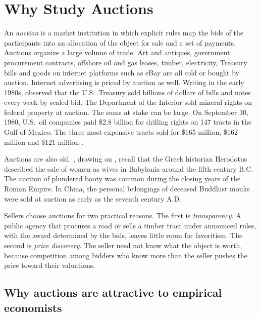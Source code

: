 
\section{Why Study Auctions}\label{sec:14-why}

An \emph{auction} is a market institution in which explicit rules map the bids of the participants into an
allocation of the object for sale and a set of payments. Auctions organize a large volume of trade. Art and
antiques, government procurement contracts, offshore oil and gas leases, timber, electricity, Treasury bills
and goods on internet platforms such as eBay are all sold or bought by auction. Internet advertising is
priced by auction as well. Writing in the early 1980s, \citet[p.~1089]{MilgromWeber1982} observed that the
U.S.\ Treasury sold billions of dollars of bills and notes every week by sealed bid. The Department of the
Interior sold mineral rights on federal property at auction. The sums at stake can be large. On September
30, 1980, U.S.\ oil companies paid \$2.8 billion for drilling rights on 147 tracts in the Gulf of Mexico.
The three most expensive tracts sold for \$165 million, \$162 million and \$121 million
\citep[p.~1089, footnote~3]{MilgromWeber1982}.

Auctions are also old. \citet[p.~1089]{MilgromWeber1982}, drawing on \citet{Cassady1967}, recall that the
Greek historian Herodotus described the sale of women as wives in Babylonia around the fifth century B.C.
The auction of plundered booty was common during the closing years of the Roman Empire. In China, the
personal belongings of deceased Buddhist monks were sold at auction as early as the seventh century A.D.

Sellers choose auctions for two practical reasons. The first is \emph{transparency}. A public agency that
procures a road or sells a timber tract under announced rules, with the award determined by the bids,
leaves little room for favoritism. The second is \emph{price discovery}. The seller need not know what the
object is worth, because competition among bidders who know more than the seller pushes the price toward
their valuations.

\subsection{Why auctions are attractive to empirical economists}\label{sec:14-why-data}

